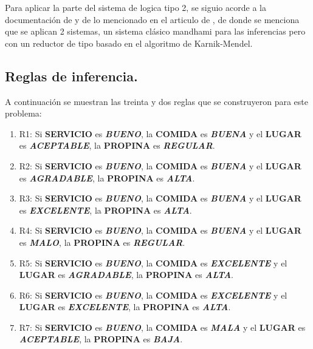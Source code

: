 \documentclass[11pt, letterpaper]{article}
\begin{document}
Para aplicar la parte del sistema de logica tipo 2, se siguio acorde a la documentación de \cite{haghrah2025pyit2fls} y de lo mencionado en el articulo de \cite{lu_genetic-algorithm-based_2015}, de donde se menciona que se aplican 2 sistemas, un sistema clásico mandhami para las inferencias pero con un reductor de tipo basado en el algoritmo de Karnik-Mendel.


\newpage

\subsection{Reglas de inferencia.}

A continuación se muestran las treinta y dos reglas que se construyeron para este problema:

\begin{enumerate}
	\item R1: Si \textbf{SERVICIO} es \textbf{\textit{BUENO}}, la \textbf{COMIDA} es \textbf{\textit{BUENA}} y el \textbf{LUGAR} es \textbf{\textit{ACEPTABLE}}, la \textbf{PROPINA} es \textbf{\textit{REGULAR}}.
	\item R2: Si \textbf{SERVICIO} es \textbf{\textit{BUENO}}, la \textbf{COMIDA} es \textbf{\textit{BUENA}} y el \textbf{LUGAR} es \textbf{\textit{AGRADABLE}}, la \textbf{PROPINA} es \textbf{\textit{ALTA}}.
	\item R3: Si \textbf{SERVICIO} es \textbf{\textit{BUENO}}, la \textbf{COMIDA} es \textbf{\textit{BUENA}} y el \textbf{LUGAR} es \textbf{\textit{EXCELENTE}}, la \textbf{PROPINA} es \textbf{\textit{ALTA}}.
	\item R4: Si \textbf{SERVICIO} es \textbf{\textit{BUENO}}, la \textbf{COMIDA} es \textbf{\textit{BUENA}} y el \textbf{LUGAR} es \textbf{\textit{MALO}}, la \textbf{PROPINA} es \textbf{\textit{REGULAR}}.
	\item R5: Si \textbf{SERVICIO} es \textbf{\textit{BUENO}}, la \textbf{COMIDA} es \textbf{\textit{EXCELENTE}} y el \textbf{LUGAR} es \textbf{\textit{AGRADABLE}}, la \textbf{PROPINA} es \textbf{\textit{ALTA}}.
	\item R6: Si \textbf{SERVICIO} es \textbf{\textit{BUENO}}, la \textbf{COMIDA} es \textbf{\textit{EXCELENTE}} y el \textbf{LUGAR} es \textbf{\textit{EXCELENTE}}, la \textbf{PROPINA} es \textbf{\textit{ALTA}}.
	\item R7: Si \textbf{SERVICIO} es \textbf{\textit{BUENO}}, la \textbf{COMIDA} es \textbf{\textit{MALA}} y el \textbf{LUGAR} es \textbf{\textit{ACEPTABLE}}, la \textbf{PROPINA} es \textbf{\textit{BAJA}}.

\end{enumerate}
\end{document}
